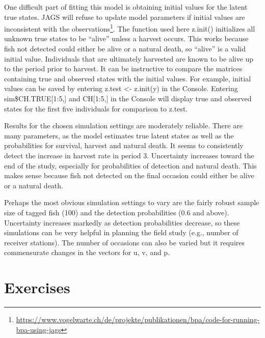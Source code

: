 \documentclass[
]{krantz}
\renewcommand{\href}[2]{#2\footnote{\url{#1}}}
\begin{document}
One difficult part of fitting this model is obtaining initial values for the latent true states. JAGS will refuse to update model parameters if initial values are inconsistent with the \href{https://www.vogelwarte.ch/de/projekte/publikationen/bpa/code-for-running-bpa-using-jags}{observations}. The function used here z.init() initializes all unknown true states to be ``alive'' unless a harvest occurs. This works because fish not detected could either be alive or a natural death, so ``alive'' is a valid initial value. Individuals that are ultimately harvested are known to be alive up to the period prior to harvest. It can be instructive to compare the matrices containing true and observed states with the initial values. For example, initial values can be saved by entering z.test \textless- z.init(y) in the Console. Entering sim\$CH.TRUE{[}1:5,{]} and CH{[}1:5,{]} in the Console will display true and observed states for the first five individuals for comparison to z.test.

Results for the chosen simulation settings are moderately reliable. There are many parameters, as the model estimates true latent states as well as the probabilities for survival, harvest and natural death. It seems to consistently detect the increase in harvest rate in period 3. Uncertainty increases toward the end of the study, especially for probabilities of detection and natural death. This makes sense because fish not detected on the final occasion could either be alive or a natural death.

Perhaps the most obvious simulation settings to vary are the fairly robust sample size of tagged fish (100) and the detection probabilities (0.6 and above). Uncertainty increases markedly as detection probabilities decrease, so these simulations can be very helpful in planning the field study (e.g., number of receiver stations). The number of occasions can also be varied but it requires commensurate changes in the vectors for u, v, and p.

\hypertarget{exercises-4}{%
\section{Exercises}\label{exercises-4}}
\end{document}
